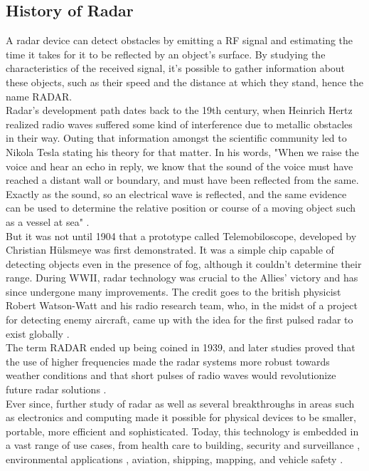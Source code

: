 \subsection{History of Radar}
\label{history}
A radar device can detect obstacles by emitting a \gls{RF} signal and estimating the time it takes for it to be reflected by an object's surface. By studying the characteristics of the received signal, it's possible to gather information about these objects, such as their speed and the distance at which they stand, hence the name \gls{RADAR}.\\
Radar's development path dates back to the 19th century, when Heinrich Hertz realized radio waves suffered some kind of interference due to metallic obstacles in their way. Outing that information amongst the scientific community led to Nikola Tesla stating his theory for that matter. In his words, "When we raise the voice and hear an echo in reply, we know that the sound of the voice must have reached a distant wall or boundary, and must have been reflected from the same. Exactly as the sound, so an electrical wave is reflected, and the same evidence can be used to determine the relative position or course of a moving object such as a vessel at sea" \cite{radarHistory}.\\
But it was not until 1904 that a prototype called Telemobiloscope, developed by Christian Hülsmeye was first demonstrated. It was a simple chip capable of detecting objects even in the presence of fog, although it couldn't determine their range.
During WWII, radar technology was crucial to the Allies' victory and has since undergone many improvements. The credit goes to the british physicist Robert Watson-Watt and his radio research team, who, in the midst of a project for detecting enemy aircraft, came up with the idea for the first pulsed radar to exist globally \cite{fmcwBookJankiraman}.\\
The term RADAR ended up being coined in 1939, and later studies proved that the use of higher frequencies made the radar systems more robust towards weather conditions and that short pulses of radio waves would revolutionize future radar solutions \cite{radarHistory}.\\
Ever since, further study of radar as well as several breakthroughs in areas such as electronics and computing made it possible for physical devices to be smaller, portable, more efficient and sophisticated. Today, this technology is embedded in a vast range of use cases, from health care \cite{radarHealthcare, radarApplications} to building, security and surveillance \cite{radarApplications}, environmental applications \cite{radarEnvironmentalAppli}, aviation, shipping, mapping, and vehicle safety \cite{radarApplicationsIeee}. 

